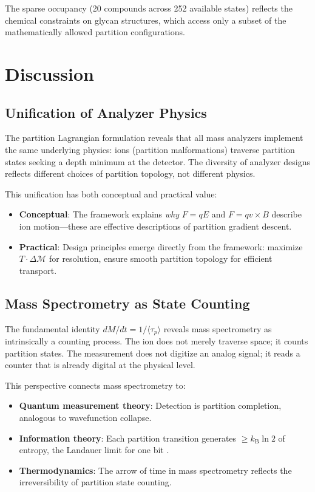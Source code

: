 \documentclass[twocolumn,10pt,a4paper]{article}
\theoremstyle{definition}
\theoremstyle{remark}
\newcommand{\kB}{k_{\mathrm{B}}}
\newcommand{\Mdepth}{\mathcal{M}}
\newcommand{\taup}{\tau_p}
\begin{document}
The sparse occupancy (20 compounds across 252 available states) reflects the chemical constraints on glycan structures, which access only a subset of the mathematically allowed partition configurations.

\section{Discussion}
\label{sec:discussion}

\subsection{Unification of Analyzer Physics}

The partition Lagrangian formulation reveals that all mass analyzers implement the same underlying physics: ions (partition malformations) traverse partition states seeking a depth minimum at the detector. The diversity of analyzer designs reflects different choices of partition topology, not different physics.

This unification has both conceptual and practical value:
\begin{itemize}
    \item \textbf{Conceptual}: The framework explains \emph{why} $F = qE$ and $F = qv \times B$ describe ion motion---these are effective descriptions of partition gradient descent.
    \item \textbf{Practical}: Design principles emerge directly from the framework: maximize $T \cdot \Delta\Mdepth$ for resolution, ensure smooth partition topology for efficient transport.
\end{itemize}

\subsection{Mass Spectrometry as State Counting}

The fundamental identity $dM/dt = 1/\langle\taup\rangle$ reveals mass spectrometry as intrinsically a counting process. The ion does not merely traverse space; it counts partition states. The measurement does not digitize an analog signal; it reads a counter that is already digital at the physical level.

This perspective connects mass spectrometry to:
\begin{itemize}
    \item \textbf{Quantum measurement theory}: Detection is partition completion, analogous to wavefunction collapse.
    \item \textbf{Information theory}: Each partition transition generates $\geq \kB \ln 2$ of entropy, the Landauer limit for one bit \citep{landauer1961}.
    \item \textbf{Thermodynamics}: The arrow of time in mass spectrometry reflects the irreversibility of partition state counting.
\end{itemize}
\end{document}
